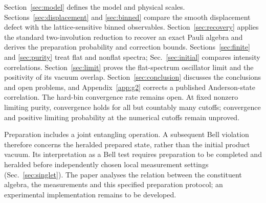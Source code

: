 \documentclass[11pt,a4paper]{article}
\begin{document}
Section~\ref{sec:model} defines the model and physical scales. Sections~\ref{sec:displacement} and \ref{sec:binned} compare the smooth displacement defect with the lattice-sensitive binned observables. Section~\ref{sec:recovery} applies the standard two-involution reduction \cite{Masanes2005,Kaniewski2016} to recover an exact Pauli algebra and derives the preparation probability and correction bounds. Sections~\ref{sec:finite} and \ref{sec:purity} treat flat and nonflat spectra; Sec.~\ref{sec:initial} compares intensity correlations. Section~\ref{sec:limit} proves the flat-spectrum oscillator limit and the positivity of its vacuum overlap. Section~\ref{sec:conclusion} discusses the conclusions and open problems, and Appendix~\ref{app:g2} corrects a published Anderson-state correlation. The hard-bin convergence rate remains open. At fixed nonzero limiting purity, convergence holds for all but countably many cutoffs; convergence and positive limiting probability at the numerical cutoffs remain unproved.

Preparation includes a joint entangling operation. A subsequent Bell violation therefore concerns the heralded prepared state, rather than the initial product vacuum. Its interpretation as a Bell test requires preparation to be completed and heralded before independently chosen local measurement settings (Sec.~\ref{sec:singlet}). The paper analyses the relation between the constituent algebra, the measurements and this specified preparation protocol; an experimental implementation remains to be developed.
\end{document}
